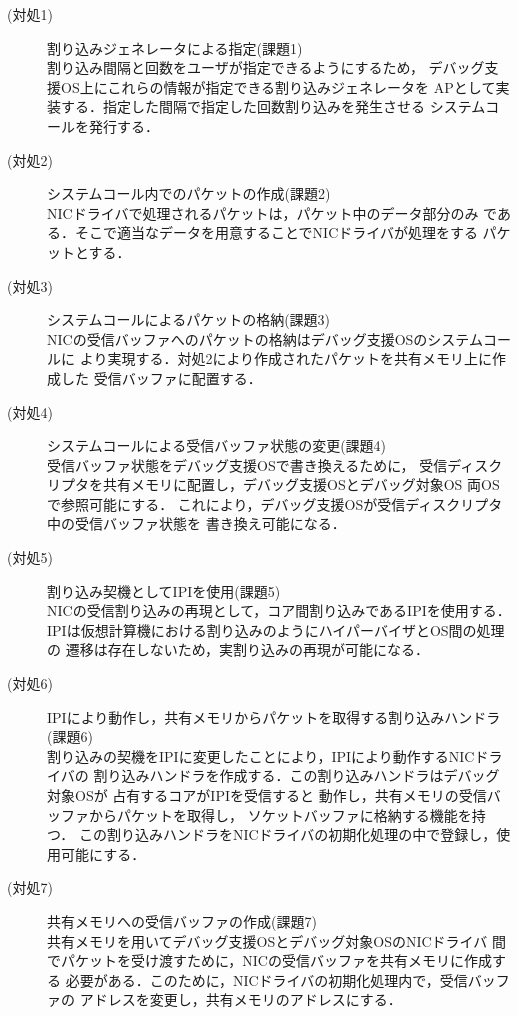 \documentclass[tanilab-enum]{graduate}
\begin{document}
\begin{description}
    \item[(対処1)]割り込みジェネレータによる指定(課題1)\\
        割り込み間隔と回数をユーザが指定できるようにするため，
        デバッグ支援OS上にこれらの情報が指定できる割り込みジェネレータを
        APとして実装する．指定した間隔で指定した回数割り込みを発生させる
        システムコールを発行する．
    \item[(対処2)]システムコール内でのパケットの作成(課題2)\\
        NICドライバで処理されるパケットは，パケット中のデータ部分のみ
        である．そこで適当なデータを用意することでNICドライバが処理をする
        パケットとする．
    \item[(対処3)]システムコールによるパケットの格納(課題3)\\
        NICの受信バッファへのパケットの格納はデバッグ支援OSのシステムコールに
        より実現する．対処2により作成されたパケットを共有メモリ上に作成した
        受信バッファに配置する．
    \item[(対処4)]システムコールによる受信バッファ状態の変更(課題4)\\
        受信バッファ状態をデバッグ支援OSで書き換えるために，
        受信ディスクリプタを共有メモリに配置し，デバッグ支援OSとデバッグ対象OS
        両OSで参照可能にする．
        これにより，デバッグ支援OSが受信ディスクリプタ中の受信バッファ状態を
        書き換え可能になる．
    \item[(対処5)]割り込み契機としてIPIを使用(課題5)\\
        NICの受信割り込みの再現として，コア間割り込みであるIPIを使用する．
        IPIは仮想計算機における割り込みのようにハイパーバイザとOS間の処理の
        遷移は存在しないため，実割り込みの再現が可能になる．
    \item[(対処6)]IPIにより動作し，共有メモリからパケットを取得する割り込みハンドラ(課題6)\\
        割り込みの契機をIPIに変更したことにより，IPIにより動作するNICドライバの
        割り込みハンドラを作成する．この割り込みハンドラはデバッグ対象OSが
        占有するコアがIPIを受信すると
        動作し，共有メモリの受信バッファからパケットを取得し，
        ソケットバッファに格納する機能を持つ．
        この割り込みハンドラをNICドライバの初期化処理の中で登録し，使用可能にする．
    \item[(対処7)]共有メモリへの受信バッファの作成(課題7)\\
        共有メモリを用いてデバッグ支援OSとデバッグ対象OSのNICドライバ
        間でパケットを受け渡すために，NICの受信バッファを共有メモリに作成する
        必要がある．このために，NICドライバの初期化処理内で，受信バッファの
        アドレスを変更し，共有メモリのアドレスにする．

\end{description}
\end{document}
